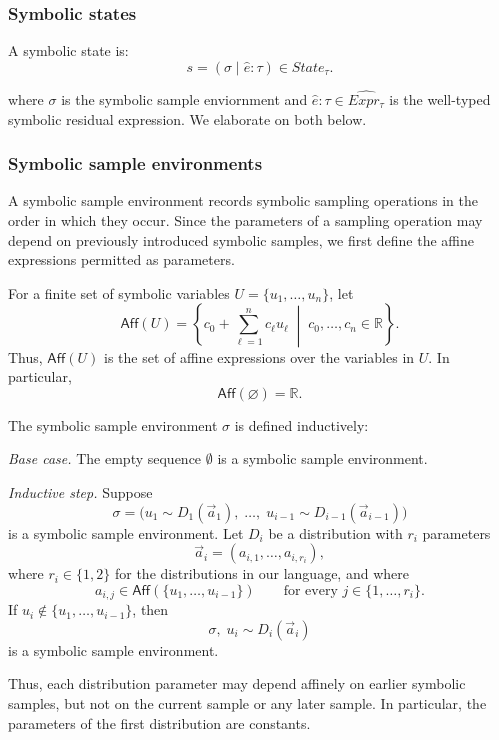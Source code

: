 \subsubsection{Symbolic states}
A symbolic state is:
\[
  s = (\sigma \mid \hat{e} : \tau) \in State_\tau.
\]

where $\sigma$ is the symbolic sample enviornment and $\hat{e} : \tau \in \widehat{Expr_\tau}$ is the well-typed symbolic residual expression. We elaborate on both below.

\subsubsection{Symbolic sample environments}
A symbolic sample environment records symbolic sampling operations in the
order in which they occur. Since the parameters of a sampling operation may
depend on previously introduced symbolic samples, we first define the affine
expressions permitted as parameters. 

For a finite set of symbolic variables $U=\{u_1,\ldots,u_n\}$, let
\[
  \mathsf{Aff}(U)
  =
  \left\{
    c_0+\sum_{\ell=1}^{n} c_\ell u_\ell
    \;\middle|\;
    c_0,\ldots,c_n\in\mathbb{R}
  \right\}.
\]
Thus, $\mathsf{Aff}(U)$ is the set of affine expressions over the variables
in $U$. In particular,
\[
  \mathsf{Aff}(\varnothing)=\mathbb{R}.
\]

\begin{definition}
  The symbolic sample environment $\sigma$ is defined inductively:

  \textit{Base case.}
  The empty sequence $\emptyset$ is a symbolic sample environment.

  \textit{Inductive step.}
  Suppose
  \[
    \sigma
    =
    \bigl(
      u_1 \sim D_1(\vec a_1),\;
      \ldots,\;
      u_{i-1} \sim D_{i-1}(\vec a_{i-1})
    \bigr)
  \]
  is a symbolic sample environment. Let $D_i$ be a distribution with
  $r_i$ parameters
  \[
    \vec a_i=(a_{i,1},\ldots,a_{i,r_i}),
  \]
  where $r_i\in\{1,2\}$ for the distributions in our language, and where
  \[
    a_{i,j}\in\mathsf{Aff}(\{u_1,\ldots,u_{i-1}\})
    \qquad
    \text{for every }j\in\{1,\ldots,r_i\}.
  \]
  If $u_i\notin\{u_1,\ldots,u_{i-1}\}$, then
  \[
    \sigma,\;u_i\sim D_i(\vec a_i)
  \]
  is a symbolic sample environment.
\end{definition}

Thus, each distribution parameter may depend affinely on earlier symbolic
samples, but not on the current sample or any later sample. In particular,
the parameters of the first distribution are constants.

